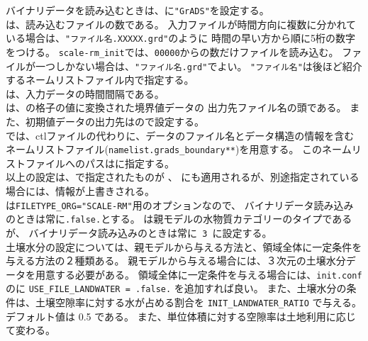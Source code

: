 バイナリデータを読み込むときは、に\verb|"GrADS"|を設定する。\\
は、読み込むファイルの数である。
入力ファイルが時間方向に複数に分かれている場合は、\verb|"ファイル名.XXXXX.grd"|のように
時間の早い方から順に5桁の数字をつける。
\verb|scale-rm_init|では、\verb|00000|からの数だけファイルを読み込む。
ファイルが一つしかない場合は、\verb|"ファイル名.grd"|でよい。
\verb|"ファイル名"|は後ほど紹介するネームリストファイル内で指定する。\\
は、入力データの時間間隔である。\\
は、\scalerm の格子の値に変換された境界値データの
出力先ファイル名の頭である。
また、初期値データの出力先はので設定する。\\
\scalerm では、ctlファイルの代わりに、データのファイル名とデータ構造の情報を含む
ネームリストファイル(\verb|namelist.grads_boundary**|)を用意する。
このネームリストファイルへのパスはに指定する。\\
以上の設定は、で指定されたものが
、
にも適用されるが、別途指定されている場合には、情報が上書きされる。\\
%
は\verb|FILETYPE_ORG="SCALE-RM"|用のオプションなので、
バイナリデータ読み込みのときは常に\verb|.false.|とする。
は親モデルの水物質カテゴリーのタイプであるが、
バイナリデータ読み込みのときは常に\verb| 3 |に設定する。\\


土壌水分の設定については、親モデルから与える方法と、領域全体に一定条件を与える方法の２種類ある。
親モデルから与える場合には、３次元の土壌水分データを用意する必要がある。
領域全体に一定条件を与える場合には、\verb|init.conf|のに
\verb|USE_FILE_LANDWATER = .false.| を追加すれば良い。
また、土壌水分の条件は、土壌空隙率に対する水が占める割合を
\verb|INIT_LANDWATER_RATIO| で与える。デフォルト値は 0.5 である。
また、単位体積に対する空隙率は土地利用に応じて変わる。\\

\\


